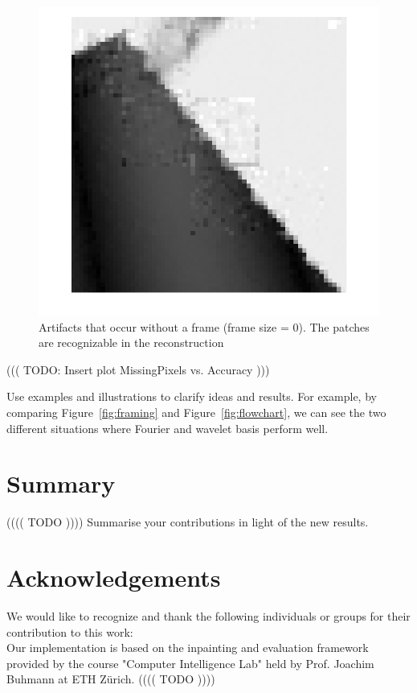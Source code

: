 \documentclass[10pt,conference,compsocconf]{IEEEtran}
\begin{document}
\begin{figure}[tbp]
  \centering
  \includegraphics[width=\columnwidth]{images/boundaryArtifact_noframe.png}
  \caption{Artifacts that occur without a frame (frame size = 0). The patches are recognizable in the reconstruction}
  \label{fig:boundaryArtifacts}
\end{figure}

((( TODO: Insert plot MissingPixels vs. Accuracy )))

Use examples and illustrations to clarify ideas and results. For
example, by comparing Figure~\ref{fig:framing} and
Figure~\ref{fig:flowchart}, we can see the two different
situations where Fourier and wavelet basis perform well. 

\section{Summary}
(((( TODO ))))
  Summarise your contributions in light of the new
  results.
  

\section*{Acknowledgements}
We would like to recognize and thank the following individuals or groups for their contribution to this work:\\
Our implementation is based on the inpainting and evaluation framework provided by the course "Computer Intelligence Lab" held by Prof. Joachim Buhmann at ETH Zürich.
(((( TODO ))))




\end{document}
